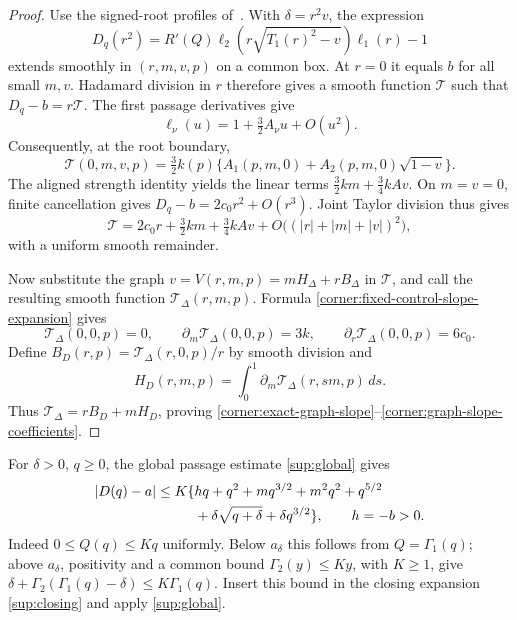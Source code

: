 \begin{proof}
Use the signed-root profiles
of~\cite[Section~3]{main2026}.
With $\delta=r^2v$, the expression
\[
 D_q(r^2)=R'(Q)\ell_2(r\sqrt{T_1(r)^2-v})\ell_1(r)-1
\]
extends smoothly in $(r,m,v,p)$ on a common box.  At $r=0$ it equals
$b$ for all small $m,v$.  Hadamard division in $r$ therefore gives a
smooth function $\mathcal T$ such that $D_q-b=r\mathcal T$.
The first passage derivatives give
\[
 \ell_\nu(u)=1+\tfrac32 A_\nu u+O(u^2).
\]
Consequently, at the root boundary,
\[
 \mathcal T(0,m,v,p)
 =\tfrac32 k(p)
   \{A_1(p,m,0)+A_2(p,m,0)\sqrt{1-v}\}.
\]
The aligned strength identity yields the linear terms
$\tfrac32km+\tfrac34kAv$.  On $m=v=0$, finite cancellation gives
$D_q-b=2c_0r^2+O(r^3)$.  Joint Taylor division thus gives
\begin{equation}\label{corner:fixed-control-slope-expansion}
 \mathcal T
 =2c_0r+\tfrac32km+\tfrac34kAv
       +O\bigl((|r|+|m|+|v|)^2\bigr),
\end{equation}
with a uniform smooth remainder.

Now substitute the graph
$v=V(r,m,p)=mH_\Delta+rB_\Delta$ in $\mathcal T$, and call the resulting
smooth function $\mathcal T_\Delta(r,m,p)$. Formula
\eqref{corner:fixed-control-slope-expansion} gives
\[
 \mathcal T_\Delta(0,0,p)=0,\qquad
 \partial_m\mathcal T_\Delta(0,0,p)=3k,\qquad
 \partial_r\mathcal T_\Delta(0,0,p)=6c_0.
\]
Define $B_D(r,p)=\mathcal T_\Delta(r,0,p)/r$ by smooth division and
\[
 H_D(r,m,p)=\int_0^1\partial_m\mathcal T_\Delta(r,sm,p)\,ds.
\]
Thus $\mathcal T_\Delta=rB_D+mH_D$, proving
\eqref{corner:exact-graph-slope}--\eqref{corner:graph-slope-coefficients}.
\end{proof}

For $\delta>0$, $q\geq0$, the global passage estimate
\eqref{sup:global} gives
\begin{align}
 |D(q)-a|\leq K\{&
 hq+q^2+mq^{3/2}+m^2q^2+q^{5/2}\notag\\
 &+\delta\sqrt{q+\delta}+\delta q^{3/2}\},
 \qquad h=-b>0.                         \label{corner:global-comparison}
\end{align}
Indeed $0\leq Q(q)\leq Kq$ uniformly.  Below $a_\delta$ this follows from
$Q=\Gamma_1(q)$; above $a_\delta$, positivity and a common bound
$\Gamma_2(y)\leq Ky$, with $K\geq1$, give
$\delta+\Gamma_2(\Gamma_1(q)-\delta)\leq K\Gamma_1(q)$.
Insert this bound in the closing expansion
\eqref{sup:closing} and apply
\eqref{sup:global}.

